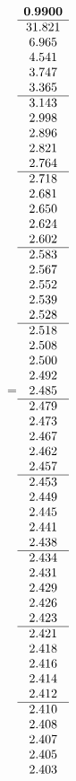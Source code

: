 =\hbox{$\begin{array}{c}
\bf 0.9900 
 \\ \hline 
  31.821 \\ 
   6.965 \\ 
   4.541 \\ 
   3.747 \\ 
   3.365
 \\ \hline 
   3.143 \\ 
   2.998 \\ 
   2.896 \\ 
   2.821 \\ 
   2.764
 \\ \hline 
   2.718 \\ 
   2.681 \\ 
   2.650 \\ 
   2.624 \\ 
   2.602
 \\ \hline 
   2.583 \\ 
   2.567 \\ 
   2.552 \\ 
   2.539 \\ 
   2.528
 \\ \hline 
   2.518 \\ 
   2.508 \\ 
   2.500 \\ 
   2.492 \\ 
   2.485
 \\ \hline 
   2.479 \\ 
   2.473 \\ 
   2.467 \\ 
   2.462 \\ 
   2.457
 \\ \hline 
   2.453 \\ 
   2.449 \\ 
   2.445 \\ 
   2.441 \\ 
   2.438
 \\ \hline 
   2.434 \\ 
   2.431 \\ 
   2.429 \\ 
   2.426 \\ 
   2.423
 \\ \hline 
   2.421 \\ 
   2.418 \\ 
   2.416 \\ 
   2.414 \\ 
   2.412
 \\ \hline 
   2.410 \\ 
   2.408 \\ 
   2.407 \\ 
   2.405 \\ 
   2.403
 \end{array}$}

